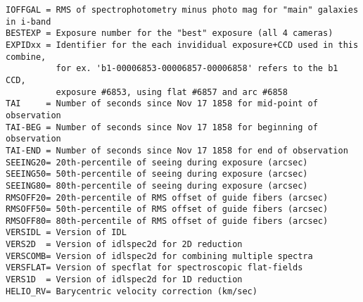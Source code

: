 \documentclass[12pt,preprint]{aastex}
\begin{document}
\begin{verbatim}
IOFFGAL = RMS of spectrophotometry minus photo mag for "main" galaxies in i-band
BESTEXP = Exposure number for the "best" exposure (all 4 cameras)
EXPIDxx = Identifier for the each invididual exposure+CCD used in this combine,
          for ex. 'b1-00006853-00006857-00006858' refers to the b1 CCD,
          exposure #6853, using flat #6857 and arc #6858
TAI     = Number of seconds since Nov 17 1858 for mid-point of observation
TAI-BEG = Number of seconds since Nov 17 1858 for beginning of observation
TAI-END = Number of seconds since Nov 17 1858 for end of observation
SEEING20= 20th-percentile of seeing during exposure (arcsec)
SEEING50= 50th-percentile of seeing during exposure (arcsec)
SEEING80= 80th-percentile of seeing during exposure (arcsec)
RMSOFF20= 20th-percentile of RMS offset of guide fibers (arcsec)
RMSOFF50= 50th-percentile of RMS offset of guide fibers (arcsec)
RMSOFF80= 80th-percentile of RMS offset of guide fibers (arcsec)
VERSIDL = Version of IDL
VERS2D  = Version of idlspec2d for 2D reduction
VERSCOMB= Version of idlspec2d for combining multiple spectra
VERSFLAT= Version of specflat for spectroscopic flat-fields
VERS1D  = Version of idlspec2d for 1D reduction
HELIO_RV= Barycentric velocity correction (km/sec)
\end{verbatim}
\end{document}
